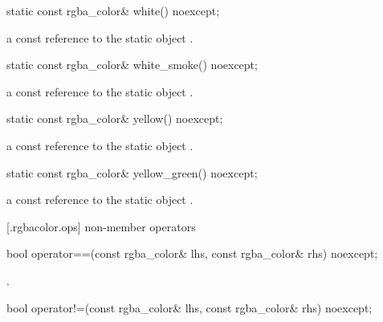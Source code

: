 \begin{itemdecl}
    static const rgba_color& white() noexcept;
\end{itemdecl}
\begin{itemdescr}
    \pnum
    \returns
    a const reference to the static  object .
\end{itemdescr}

\begin{itemdecl}
    static const rgba_color& white_smoke() noexcept;
\end{itemdecl}
\begin{itemdescr}
    \pnum
    \returns
    a const reference to the static  object .
\end{itemdescr}

\begin{itemdecl}
    static const rgba_color& yellow() noexcept;
\end{itemdecl}
\begin{itemdescr}
    \pnum
    \returns
    a const reference to the static  object .
\end{itemdescr}

\begin{itemdecl}
    static const rgba_color& yellow_green() noexcept;
\end{itemdecl}
\begin{itemdescr}
    \pnum
    \returns
    a const reference to the static  object .
\end{itemdescr}

 [\iotwod.rgbacolor.ops] { non-member operators}

\begin{itemdecl}
bool operator==(const rgba_color& lhs, const rgba_color& rhs) noexcept;
\end{itemdecl}
\begin{itemdescr}
	\pnum
	\returns
	.
\end{itemdescr}

\begin{itemdecl}
bool operator!=(const rgba_color& lhs, const rgba_color& rhs) noexcept;
\end{itemdecl}
\begin{itemdescr}
	\pnum
	\returns
\end{itemdescr}
